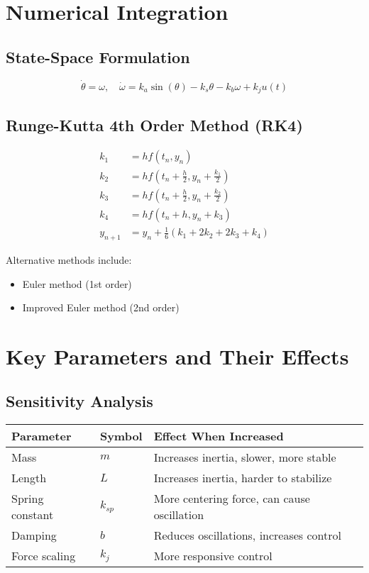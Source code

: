 \documentclass[11pt]{article}
\begin{document}
\section{Numerical Integration}

\subsection{State-Space Formulation}
\[
\dot{\theta} = \omega, \quad
\dot{\omega} = k_a \sin(\theta) - k_s \theta - k_b \omega + k_j u(t)
\]

\subsection{Runge-Kutta 4th Order Method (RK4)}
\[
\begin{aligned}
k_1 &= h f(t_n, y_n) \\
k_2 &= h f\left(t_n + \frac{h}{2}, y_n + \frac{k_1}{2}\right) \\
k_3 &= h f\left(t_n + \frac{h}{2}, y_n + \frac{k_2}{2}\right) \\
k_4 &= h f(t_n + h, y_n + k_3) \\
y_{n+1} &= y_n + \frac{1}{6}(k_1 + 2k_2 + 2k_3 + k_4)
\end{aligned}
\]

Alternative methods include:
\begin{itemize}
  \item Euler method (1st order)
  \item Improved Euler method (2nd order)
\end{itemize}

\section{Key Parameters and Their Effects}

\subsection{Sensitivity Analysis}
\begin{tabular}{@{}lll@{}}
\toprule
Parameter & Symbol & Effect When Increased \\
\midrule
Mass & $m$ & Increases inertia, slower, more stable \\
Length & $L$ & Increases inertia, harder to stabilize \\
Spring constant & $k_{sp}$ & More centering force, can cause oscillation \\
Damping & $b$ & Reduces oscillations, increases control \\
Force scaling & $k_j$ & More responsive control \\
\bottomrule
\end{tabular}
\end{document}
